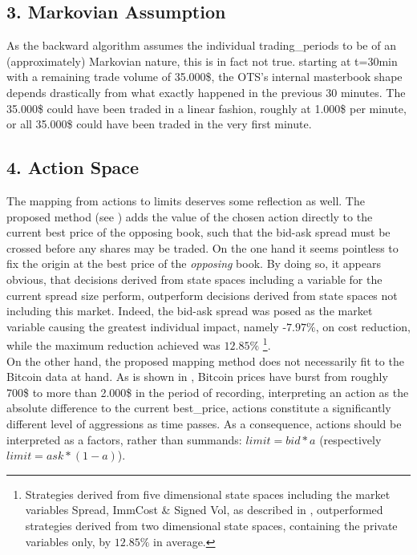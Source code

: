 \subsection*{3. Markovian Assumption}
As the backward algorithm assumes the individual trading\_periods to be of an (approximately) Markovian nature, this is in fact not true. \Eg starting at t=30min with a remaining trade volume of 35.000\$, the \ac{OTS}'s internal masterbook shape depends drastically from what exactly happened in the previous 30 minutes. The 35.000\$ could have been traded in a linear fashion, roughly at 1.000\$ per minute, or all 35.000\$ could have been traded in the very first minute.

\subsection*{4. Action Space}
The mapping from actions to limits deserves some reflection as well. The proposed method (see ) adds the value of the chosen action directly to the current best price of the opposing book, such that the bid-ask spread must be crossed before any shares may be traded. On the one hand it seems pointless to fix the origin at the best price of the \emph{opposing} book. By doing so, it appears obvious, that decisions derived from state spaces including a variable for the current spread size perform, outperform decisions derived from state spaces not including this market. Indeed, the  bid-ask spread was posed as the market variable causing the greatest individual impact, namely -$7.97\%$, on cost reduction, while the maximum reduction achieved was $12.85\%$ \footnote{Strategies derived from five dimensional state spaces including the market variables Spread, ImmCost \& Signed Vol, as described in , outperformed strategies derived from two dimensional state spaces, containing the private variables only, by $12.85\%$ in average.}.\\

On the other hand, the proposed mapping method does not necessarily fit to the Bitcoin data at hand. As is shown in , Bitcoin prices have burst from roughly 700\$ to more than 2.000\$ in the period of recording, \ie interpreting an action as the absolute difference to the current best\_price, actions constitute a significantly different level of aggressions as time passes. As a consequence, actions should be interpreted as a factors, rather than summands: $limit = bid * a$ (respectively $limit = ask * (1-a)$).


